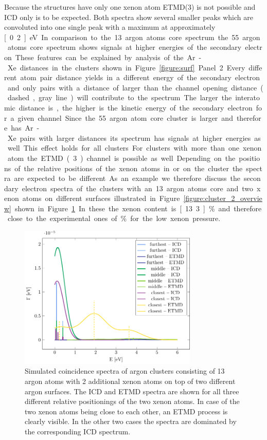 Because the structures have only one xenon atom ETMD(3) is not possible and
ICD only is to be expected. Both spectra show several smaller peaks which
are convoluted into one single peak with a maximum at
approximately \unit[0.2]{eV}. In comparison to the 13 argon atoms core
spectrum the 55 argon atoms core spectrum shows
signals at higher energies of the secondary electron. These features
can be explained by analysis of the Ar-Xe distances in the clusters shown
in Figure \ref{figure:surf} Panel 2. Every different atom pair distance
yields in a different energy of the secondary electron and only pairs
with a distance of larger than the channel opening distance
(dashed, gray line) will contribute
to the spectrum. The larger the interatomic distance is, the higher is the
kinetic energy of the secondary electron for a given channel.
Since the 55 argon atom core cluster is larger and therefore
has Ar-Xe pairs with larger distances its spectrum has signals at higher
energies as well.
This effect holds for all clusters.


For clusters with more than one xenon atom the ETMD(3) channel is possible
as well. Depending on the positions of the relative positions of the xenon
atoms in or on the cluster the spectra are expected to be different.
As an example we therefore discuss the secondary electron spectra of the
clusters with an 13 argon atoms core and two xenon atoms on different
surfaces illustrated in Figure \ref{figure:cluster_2_overview} shown in Figure
\ref{figure:2tops}. In these the xenon content is \unit[13.3]{\%} and therefore
close to the experimental ones of \unit[10-12]{\%} for the low xenon pressure.

\begin{figure}[h]
 \centering
 \includegraphics[width=8.5cm]{pics/2tops.pdf}
 \caption{Simulated coincidence spectra of argon clusters consisting of 13
          argon atoms with 2 additional xenon atoms on top of two different
          argon surfaces. The ICD and ETMD spectra are shown for all three
          different relative positionings of the two xenon atoms. In case of
          the two xenon atoms being close to each other, an ETMD process is
          clearly visible. In the other two cases the spectra are dominated by
          the corresponding ICD spectrum.}
 \label{figure:2tops}
\end{figure}

